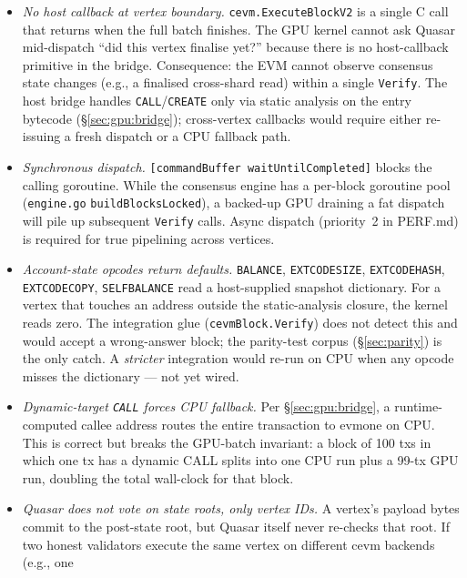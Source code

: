 \begin{itemize}
  \item \emph{No host callback at vertex boundary.}
    \texttt{cevm.ExecuteBlockV2} is a single C call that returns when the
    full batch finishes. The GPU kernel cannot ask Quasar mid-dispatch
    ``did this vertex finalise yet?'' because there is no host-callback
    primitive in the bridge. Consequence: the EVM cannot observe
    consensus state changes (e.g., a finalised cross-shard read) within
    a single \texttt{Verify}. The host bridge handles
    \texttt{CALL}/\texttt{CREATE} only via static analysis on the entry
    bytecode (\S\ref{sec:gpu:bridge}); cross-vertex callbacks would
    require either re-issuing a fresh dispatch or a CPU fallback path.
  \item \emph{Synchronous dispatch.}
    \texttt{[commandBuffer waitUntilCompleted]} blocks the calling
    goroutine. While the consensus engine has a per-block goroutine
    pool (\texttt{engine.go} \texttt{buildBlocksLocked}), a backed-up
    GPU draining a fat dispatch will pile up subsequent \texttt{Verify}
    calls. Async dispatch (priority~2 in PERF.md) is required for true
    pipelining across vertices.
  \item \emph{Account-state opcodes return defaults.}
    \texttt{BALANCE}, \texttt{EXTCODESIZE}, \texttt{EXTCODEHASH},
    \texttt{EXTCODECOPY}, \texttt{SELFBALANCE} read a host-supplied
    snapshot dictionary. For a vertex that touches an address outside
    the static-analysis closure, the kernel reads zero. The integration
    glue (\texttt{cevmBlock.Verify}) does not detect this and would
    accept a wrong-answer block; the parity-test corpus
    (\S\ref{sec:parity}) is the only catch. A \emph{stricter}
    integration would re-run on CPU when any opcode misses the
    dictionary --- not yet wired.
  \item \emph{Dynamic-target \texttt{CALL} forces CPU fallback.}
    Per \S\ref{sec:gpu:bridge}, a runtime-computed callee address
    routes the entire transaction to evmone on CPU. This is correct
    but breaks the GPU-batch invariant: a block of 100 txs in which
    one tx has a dynamic CALL splits into one CPU run plus a
    99-tx GPU run, doubling the total wall-clock for that block.
  \item \emph{Quasar does not vote on state roots, only vertex IDs.}
    A vertex's payload bytes commit to the post-state root, but
    Quasar itself never re-checks that root. If two honest validators
    execute the same vertex on different cevm backends (e.g., one

\end{itemize}

